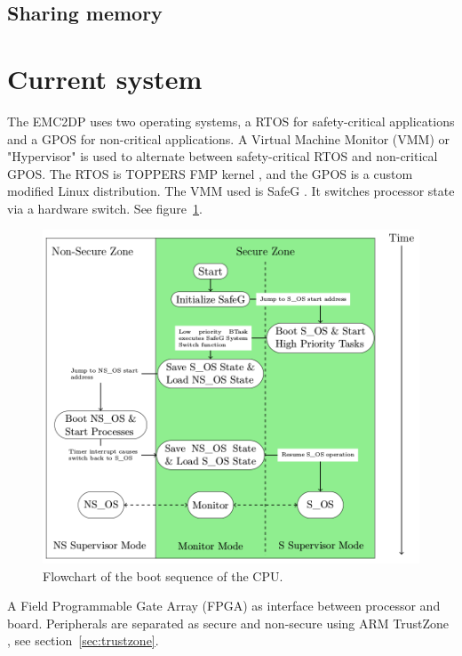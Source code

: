 \subsection{Sharing memory}

\section{Current system}
\label{sec:lit_emc2mcs}
The EMC2DP uses two operating systems, a RTOS for safety-critical applications and a GPOS for non-critical applications. A Virtual Machine Monitor (VMM) or "Hypervisor" is used to alternate between safety-critical RTOS and non-critical GPOS. The RTOS is TOPPERS FMP kernel \cite{website:FMP}, and the GPOS is a custom modified Linux distribution. The VMM used is SafeG \cite{website:safeg}. It switches processor state via a hardware switch. See figure~\ref{fig:modeswitch}.

\begin{figure}[H]
\centering
\includegraphics[width=\textwidth]{./img/literature_modeswitch.png}
\caption{Flowchart of the boot sequence of the CPU. \cite{zaki2016}}\label{fig:modeswitch}
\end{figure}

A Field Programmable Gate Array (FPGA) as interface between processor and board. Peripherals are separated as secure and non-secure using ARM TrustZone \cite{website:ARM}, see section~\ref{sec:trustzone}. \\ %

